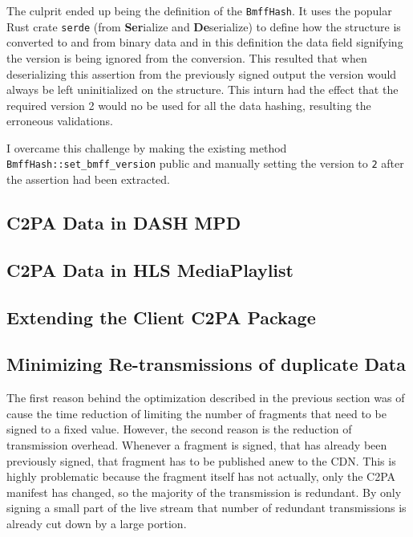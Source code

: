The culprit ended up being the definition of the \texttt{BmffHash}. It uses the popular Rust crate \texttt{serde} (from \textbf{Ser}ialize and \textbf{De}serialize) to define how the structure is converted to and from binary data and in this definition the data field signifying the version is being ignored from the conversion. This resulted that when deserializing this assertion from the previously signed output the version would always be left uninitialized on the structure. This inturn had the effect that the required version 2 would no be used for all the data hashing, resulting the erroneous validations.

I overcame this challenge by making the existing method \texttt{BmffHash::set\_bmff\_version} public and manually setting the version to \texttt{2} after the assertion had been extracted.

\subsection{C2PA Data in DASH MPD\label{sec:mpd}}


\subsection{C2PA Data in HLS MediaPlaylist\label{sec:media_playlist}}


\subsection{Extending the Client C2PA Package\label{sec:wasm}}

\subsection{Minimizing Re-transmissions of duplicate Data}

The first reason behind the optimization described in the previous section was of cause the time reduction of limiting the number of fragments that need to be signed to a fixed value. However, the second reason is the reduction of transmission overhead. Whenever a fragment is signed, that has already been previously signed, that fragment has to be published anew to the CDN. This is highly problematic because the fragment itself has not actually, only the C2PA manifest has changed, so the majority of the transmission is redundant. By only signing a small part of the live stream that number of redundant transmissions is already cut down by a large portion.

